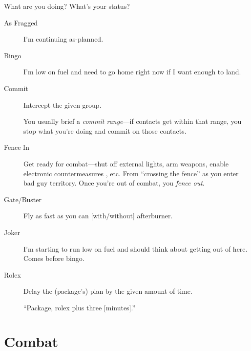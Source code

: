 What are you doing? What's your status?
\begin{description}

\item[As Fragged] I'm continuing as-planned.

\item[Bingo] I'm low on fuel and need to go home right now if I want enough
    to land.

\item[Commit] Intercept the given group.

    You usually brief a \emph{commit range}---if contacts get within that range,
    you stop what you're doing and commit on those contacts.

\item[Fence In] Get ready for combat---shut off external lights,
    arm weapons, enable electronic countermeasures , etc.
    From ``crossing the fence'' as you enter bad guy territory.
    Once you're out of combat, you \emph{fence out}.

\item[Gate/Buster] Fly as fast as you can [with/without] afterburner.

\item[Joker] I'm starting to run low on fuel and should think about getting
    out of here. Comes before bingo.

\item[Rolex] Delay the (package's) plan by the given amount of time.

    ``Package, rolex plus three [minutes].''
\end{description}

\section{Combat}

